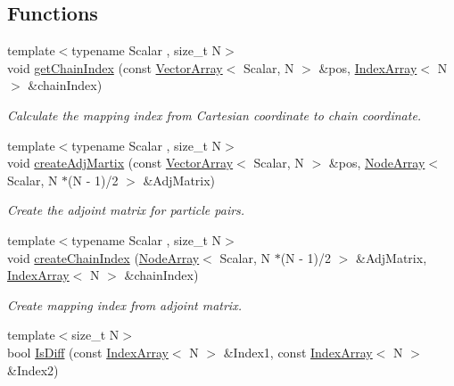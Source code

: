 \subsection*{Functions}
\begin{DoxyCompactItemize}
\item 
{\footnotesize template$<$typename Scalar , size\+\_\+t N$>$ }\\void \mbox{\hyperlink{namespacechain_a3e7b0a001442f121ce1408e7c9d12016}{get\+Chain\+Index}} (const \mbox{\hyperlink{namespacechain_aa715d2f046187ea9f0c3ea55605d6214}{Vector\+Array}}$<$ Scalar, N $>$ \&pos, \mbox{\hyperlink{namespacechain_aa40d2da395c0ac2bc5f37832442ac403}{Index\+Array}}$<$ N $>$ \&chain\+Index)
\begin{DoxyCompactList}\small\item\em Calculate the mapping index from Cartesian coordinate to chain coordinate. \end{DoxyCompactList}\item 
{\footnotesize template$<$typename Scalar , size\+\_\+t N$>$ }\\void \mbox{\hyperlink{namespacechain_a68d5d08ece7d82a6b4bb1968b783a8f3}{create\+Adj\+Martix}} (const \mbox{\hyperlink{namespacechain_aa715d2f046187ea9f0c3ea55605d6214}{Vector\+Array}}$<$ Scalar, N $>$ \&pos, \mbox{\hyperlink{namespacechain_a3a021b84403e03113e1dcd61ba304963}{Node\+Array}}$<$ Scalar, N $\ast$(N -\/ 1)/2 $>$ \&Adj\+Matrix)
\begin{DoxyCompactList}\small\item\em Create the adjoint matrix for particle pairs. \end{DoxyCompactList}\item 
{\footnotesize template$<$typename Scalar , size\+\_\+t N$>$ }\\void \mbox{\hyperlink{namespacechain_ae008a8273beabf1473c347994197ef53}{create\+Chain\+Index}} (\mbox{\hyperlink{namespacechain_a3a021b84403e03113e1dcd61ba304963}{Node\+Array}}$<$ Scalar, N $\ast$(N -\/ 1)/2 $>$ \&Adj\+Matrix, \mbox{\hyperlink{namespacechain_aa40d2da395c0ac2bc5f37832442ac403}{Index\+Array}}$<$ N $>$ \&chain\+Index)
\begin{DoxyCompactList}\small\item\em Create mapping index from adjoint matrix. \end{DoxyCompactList}\item 
{\footnotesize template$<$size\+\_\+t N$>$ }\\bool \mbox{\hyperlink{namespacechain_a874f28a6248b56c6b2b3ca45c1bbea09}{Is\+Diff}} (const \mbox{\hyperlink{namespacechain_aa40d2da395c0ac2bc5f37832442ac403}{Index\+Array}}$<$ N $>$ \&Index1, const \mbox{\hyperlink{namespacechain_aa40d2da395c0ac2bc5f37832442ac403}{Index\+Array}}$<$ N $>$ \&Index2)

\end{DoxyCompactItemize}
